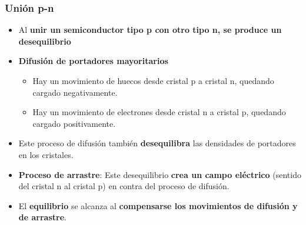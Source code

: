 \documentclass[xcolor=dvipsnames]{beamer}
\begin{document}
\begin{frame}
  \frametitle{Unión p-n}

  \begin{itemize}
  \item Al\textbf{ unir un semiconductor tipo p con otro tipo n, se
      produce un desequilibrio}
  \item \textbf{Difusión de portadores mayoritarios}

    \begin{itemize}
    \item Hay un movimiento de huecos desde cristal p a cristal n,
      quedando cargado negativamente.
    \item Hay un movimiento de electrones desde cristal n a cristal p,
      quedando cargado positivamente.
    \end{itemize}
  \item Este proceso de difusión también \textbf{desequilibra} las
    densidades de portadores en los cristales.
  \item \textbf{Proceso de arrastre}: Este desequilibrio \textbf{crea
      un campo eléctrico} (sentido del cristal n al cristal p) en
    contra del proceso de difusión.
  \item El \textbf{equilibrio} se alcanza al \textbf{compensarse los
      movimientos de difusión y de arrastre}.
  \end{itemize}

\end{frame}
\end{document}
